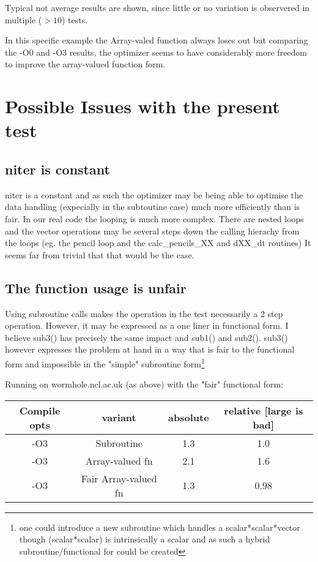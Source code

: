 \documentclass[a4paper,twoside,12pt]{article}
\begin{document}
Typical not average results are shown, since little or no variation 
is observered in multiple ($> 10$) tests.

In this specific example the Array-valed function always loses out but
comparing the -O0 and -O3 results, the optimizer seems to have considerably 
more freedom to improve the array-valued function form.

\chapter{Possible Issues with the present test}
\section{niter is constant}
niter is a constant and as such the optimizer may be being able to optimise
the data handling (expecially in the subtoutine case) much more efficiently
than is fair.  In our real code the looping is much more complex.  There are
nested loops and the vector operations may be several steps down the calling
hierachy from the loops  (eg. the pencil loop and the calc\_pencils\_XX and
dXX\_dt routines)
It seems far from trivial that that would be the case.

\section{The function usage is unfair}
Using subroutine calls makes the operation in the test necessarily a 2 step
operation.  However, it may be expressed as a one liner in functional form.
I believe sub3() has precisely the same impact and sub1() and
sub2().  sub3() however expresses the problem at hand in a way that is fair
to the functional form and impossible in the "simple" subroutine
form\footnote{one could introduce a new subroutine which handles a
scalar*scalar*vector though (scalar*scalar) is intrinsically a
scalar and as such a hybrid subroutine/functional for could be created}

Running on wormhole.ncl.ac.uk (as above) with the "fair" functional form:

\begin{tabular}{cccc}
   Compile opts     &       variant       &     absolute & relative [large is bad] \\
\hline
   -O3     &  Subroutine            &    1.3    &   1.0 \\
   -O3     &  Array-valued fn       &    2.1    &   1.6 \\
   -O3     &  Fair Array-valued fn  &    1.3    &   0.98 \\
\hline
\end{tabular}
\end{document}

